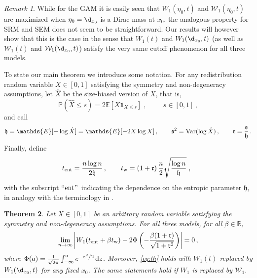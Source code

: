 \documentclass[11pt,reqno]{amsart}
\newtheorem{theorem}{Theorem}[section]
\theoremstyle{remark}
\newtheorem{remark}[theorem]{Remark}
\theoremstyle{definition}
\numberwithin{equation}{section}
\numberwithin{figure}{section}
\newcommand{\E}{\mathds{E}}
\renewcommand{\P}{\mathds{P}}
\newcommand{\R}{\mathbb{R}}
\newcommand{\dd}{{\rm d}}
\newcommand{\comma}{\; \text{,}\;\;}
\newcommand{\car}{\mathds{1}}
\newcommand{\var}{{\rm Var}}
\newcommand{\cW}{\ensuremath{\mathcal W}}
\begin{document}
	\begin{remark}\label{rem:worst}
	While for the GAM it is easily seen that $W_1(\eta_0,t)$ and $\cW_1(\eta_0,t)$ are maximized when $\eta_0=\d_{x_0}$ is a Dirac mass at  $x_0$, the analogous property for SRM and SEM does not seem to be straightforward. Our results will however show that this is the case in the sense that $W_1(t)$ and $W_1(\d_{x_0},t)$ (as well as $\cW_1(t)$ and $\cW_1(\d_{x_0},t)$) satisfy the very same cutoff phenomenon for all three models.
	\end{remark}  
	 
	To state our main theorem we introduce some notation. For any redistribution random variable $X\in[0,1]$ satisfying the symmetry and non-degeneracy assumptions,  
	let $\hat X$ be the size-biased version of $X$, that is, 
	$$\P(\hat X\le s)=2{\E[X\car_{X\le s}]}\comma\qquad s\in[0,1]\,,$$ 
	and call 
	\begin{equation}\label{eq:def-h-s}
		\mathfrak{h}=\E[-\log\hat X]=\E[-2X\log X]\,,\qquad \mathfrak{s}^2=\var(\log\hat X)\,,\qquad \mathfrak{r}=\frac{\mathfrak{s}}{\mathfrak{h}}\,.
	\end{equation}
 Finally, define 
	\begin{equation}
		t_{\rm ent}=\frac{n\log n}{2 \mathfrak{h}}\,,\qquad t_{\rm w}=\left(1+\mathfrak{r}\right)\frac{n}{2}\sqrt{\frac{\log n}{\mathfrak{h}}}\comma
	\end{equation}
	with the subscript \textquotedblleft${\rm ent}$\textquotedblright\ indicating the dependence on the entropic parameter $\mathfrak{h}$, in analogy with the terminology in \cite{bordenave_random_2018,bordenave_cutoff2019}.	
	 \begin{theorem}\label{theorem}
	Let $X\in[0,1]$ be an arbitrary random variable satisfying the symmetry and non-degeneracy assumptions. For all three models, 
for all $\beta\in\R$, 
	\begin{equation}\label{eq:th}
		\lim_{n\to\infty}\left|W_1(t_{\rm ent}+\beta   t_{\rm w})-2\Phi\left(-\frac{\beta(1+\mathfrak{r})}{\sqrt{1+\mathfrak{r}^2}}\right)\right|=0\,,
	\end{equation}
	where $\Phi(a)=\frac1{\sqrt{2\pi}}\int_{-\infty}^ae^{-z^2/2}\, \dd z$. Moreover, \eqref{eq:th} holds with $W_1(t)$ replaced by $W_1(\d_{x_0},t)$ for any fixed  $x_0$.  
	The same statements hold if $W_1$ is replaced by $\cW_1$.
\end{theorem}
\end{document}
